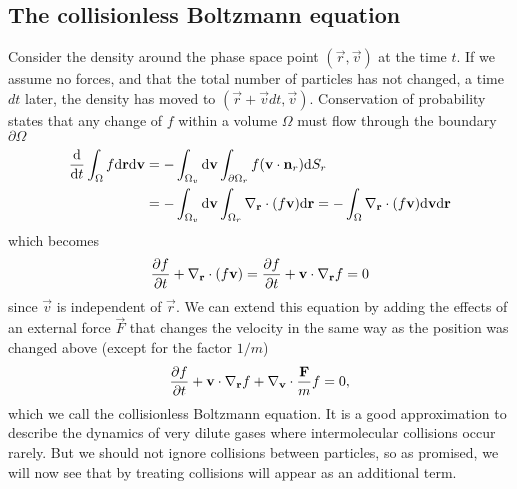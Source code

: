 \subsection{The collisionless Boltzmann equation}
Consider the density around the phase space point $(\vec r,\vec v)$ at the time $t$. If we assume no forces, and that the total number of particles has not changed, a time $dt$ later, the density has moved to $(\vec r + \vec vdt, \vec v)$. Conservation of probability states that any change of $f$ within a volume $\Omega$ must flow through the boundary $\partial \Omega$
\begin{align}
	\frac{\dm }{\dm t}\int_\Omega f \dm \vec r \dm \vec v &= -\int_{\Omega_v}\dm \vec v\int_{\partial \Omega_r} f(\vec v\cdot \vec n_r) \dm S_r\\
	&= -\int_{\Omega_v}\dm \vec v\int_{\Omega_r} \nabla_\vec r\cdot(f\vec v) \dm \vec r = -\int_{\Omega} \nabla_\vec r\cdot(f\vec v) \dm \vec v\dm \vec r
\end{align}
which becomes
\begin{align}
	\frac{\partial f}{\partial t} + \nabla_\mathbf r \cdot(f\mathbf v) = \frac{\partial f}{\partial t} + \mathbf v\cdot\nabla_\mathbf r f = 0
\end{align}
since $\vec v$ is independent of $\vec r$. We can extend this equation by adding the effects of an external force $\vec F$ that changes the velocity in the same way as the position was changed above (except for the factor $1/m$)
\begin{align}
	\label{eq:collisionless_boltzmann}
	\frac{\partial f}{\partial t} + \mathbf v\cdot\nabla_\mathbf r f + \nabla_\mathbf v \cdot \frac{\mathbf F}{ m}f = 0,
\end{align}
which we call the collisionless Boltzmann equation. It is a good approximation to describe the dynamics of very dilute gases where intermolecular collisions occur rarely. But we should not ignore collisions between particles, so as promised, we will now see that by treating collisions will appear as an additional term.
